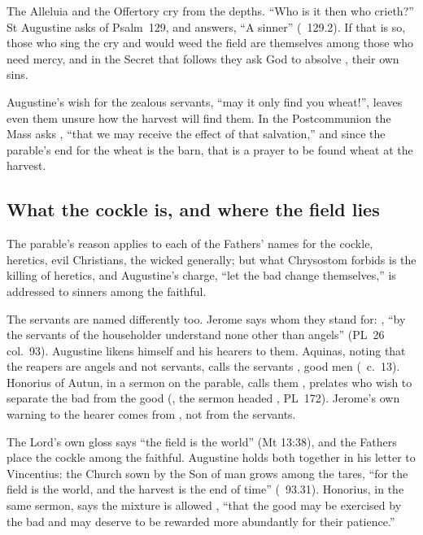 The Alleluia and the Offertory cry from the depths. ``Who is it then who
crieth?'' St Augustine asks of Psalm~129, and answers, ``A sinner''
(\ 129.2). If that is so, those who sing the cry and
would weed the field are themselves among those who need mercy, and in the
Secret that follows they ask God to absolve , their own
sins.

Augustine's wish for the zealous servants, ``may it only find you wheat!'',
leaves even them unsure how the harvest will find them. In the
Postcommunion the Mass asks ,
``that we may receive the effect of that salvation,'' and since the parable's
end for the wheat is the barn, that is a prayer to be found wheat at the
harvest.

\subsection{What the cockle is, and where the field lies}
\label{sec:patience-limits}

The parable's reason applies to each of the Fathers' names for the cockle,
heretics, evil Christians, the wicked generally; but what Chrysostom forbids
is the killing of heretics, and Augustine's charge, ``let the bad change
themselves,'' is addressed to sinners among the faithful.

The servants are named differently too. Jerome says whom they stand for:
, ``by the
servants of the householder understand none other than angels'' (PL~26
col.~93). Augustine likens himself and his hearers to them. Aquinas, noting
that the reapers are angels and not servants, calls the servants
, good men (\ c.~13). Honorius of Autun,
in a sermon on the parable, calls them , prelates who wish to separate the bad from the good
(, the sermon headed ,
PL~172). Jerome's own warning to the hearer comes from , not
from the servants.

The Lord's own gloss says ``the field is the world'' (Mt 13:38), and the
Fathers place the cockle among the faithful. Augustine holds both together in
his letter to Vincentius: the Church sown by the Son of man grows among the
tares, ``for the field is the world, and the harvest is the end of time''
(~93.31). Honorius, in the same sermon, says the mixture is allowed
, ``that the good may be exercised by the bad and may deserve to be
rewarded more abundantly for their patience.''


